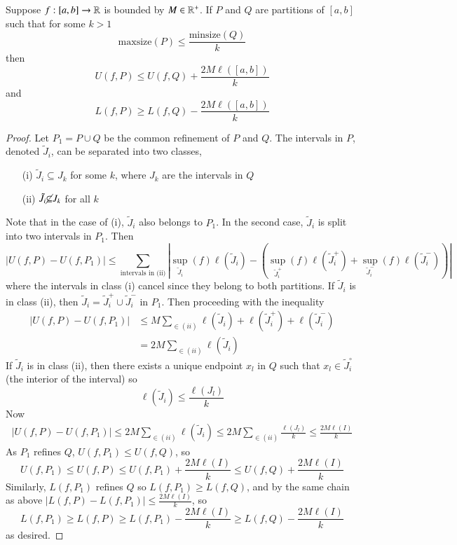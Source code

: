 \begin{prop}
    Suppose $f:[a,b]\rightarrow \mathbb R$ is bounded by $M \in \mathbb R^+$. If $P$ and $Q$ are partitions of $[a,b]$ such that for some $k > 1$ $$\text{maxsize}(P) \leq \frac{\text{minsize}(Q)}{k}$$ then $$U(f,P) \leq U(f,Q) + \frac{2M\ell([a,b])}{k}$$ and $$L(f,P) \geq L(f,Q) - \frac{2M\ell([a,b])}{k}$$
\end{prop}
\begin{proof}
    Let $P_1 = P\cup Q$ be the common refinement of $P$ and $Q$. The intervals in $P$, denoted $\tilde{J}_i$, can be separated into two classes, \begin{enumerate}
        \item[(i)] $\tilde{J}_i \subseteq J_k$ for some $k$, where $J_k$ are the intervals in $Q$
        \item[(ii)] $\tilde{J}_i\cancel{\subseteq} J_k$ for all $k$
    \end{enumerate}
    Note that in the case of (i), $\tilde{J}_i$ also belongs to $P_1$. In the second case, $\tilde{J}_i$ is split into two intervals in $P_1$. Then $$|U(f,P) - U(f,P_1)| \leq \sum_{\text{intervals in (ii)}}|\sup_{\tilde{J}_i}(f)\ell(\tilde{J}_i) - (\sup_{\tilde{J}_i^+}(f)\ell(\tilde{J}_i^+) + \sup_{\tilde{J}_i^-}(f)\ell(\tilde{J}_i^-))|$$ where the intervals in class (i) cancel since they belong to both partitions. If $\tilde{J}_i$ is in class (ii), then $\tilde{J}_i = \tilde{J}_i^+\cup\tilde{J}_i^-$ in $P_1$. Then proceeding with the inequality \begin{align*}
        |U(f,P) - U(f,P_1)| &\leq M\sum_{\in (ii)}\ell(\tilde{J}_i) + \ell(\tilde{J}_i^+) + \ell(\tilde{J}_i^-) \\
        &= 2M\sum_{\in (ii)}\ell(\tilde{J}_i)
    \end{align*}
    If $\tilde{J}_i$ is in class (ii), then there exists a unique endpoint $x_l$ in $Q$ such that $x_l \in \tilde{J}_i^{\circ}$ (the interior of the interval) so $$\ell(\tilde{J}_i) \leq \frac{\ell(J_l)}{k}$$ Now \begin{align*}
        |U(f,P) - U(f,P_1)| \leq 2M\sum_{\in (ii)}\ell(\tilde{J}_i) \leq 2M\sum_{\in (ii)}\frac{\ell(J_l)}{k} \leq \frac{2M\ell(I)}{k}
    \end{align*}
    As $P_1$ refines $Q$, $U(f,P_1) \leq U(f,Q)$, so $$U(f,P_1) \leq U(f,P) \leq U(f,P_1) + \frac{2M\ell(I)}{k} \leq U(f,Q) + \frac{2M\ell(I)}{k}$$ Similarly, $L(f,P_1)$ refines $Q$ so $L(f,P_1) \geq L(f,Q)$, and by the same chain as above $|L(f,P) - L(f,P_1)| \leq \frac{2M\ell(I)}{k}$, so $$L(f,P_1) \geq L(f,P) \geq L(f,P_1) - \frac{2M\ell(I)}{k} \geq L(f,Q) - \frac{2M\ell(I)}{k}$$ as desired.
\end{proof}

